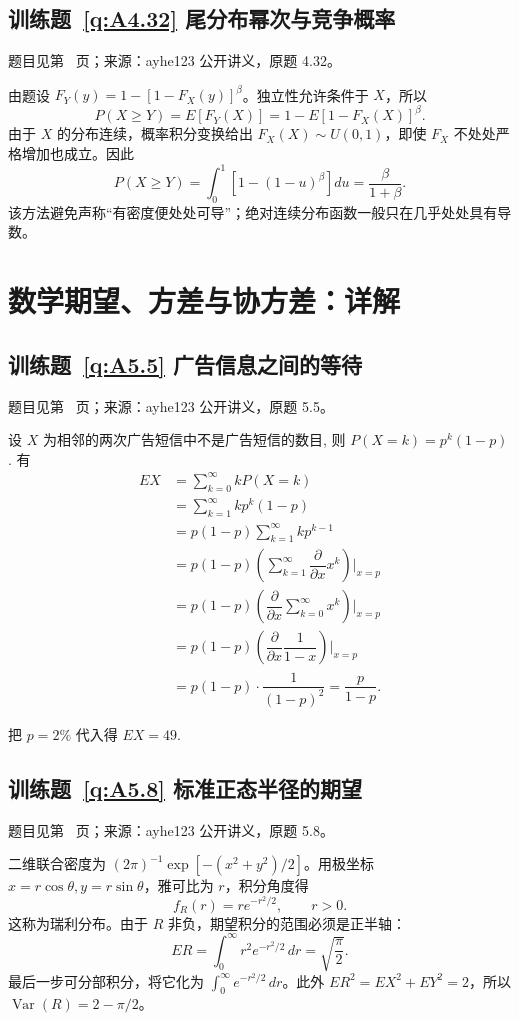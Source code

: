 \subsection*{训练题~\ref{q:A4.32} 尾分布幂次与竞争概率}\label{a:A4.32}{\small 题目见第~\pageref{q:A4.32} 页；来源：ayhe123 公开讲义，原题 4.32。}
\begin{solve}由题设 $F_Y(y)=1-[1-F_X(y)]^\beta$。独立性允许条件于 $X$，所以\[P(X\ge Y)=E[F_Y(X)]=1-E[1-F_X(X)]^\beta.\]由于 $X$ 的分布连续，概率积分变换给出 $F_X(X)\sim U(0,1)$，即使 $F_X$ 不处处严格增加也成立。因此\[P(X\ge Y)=\int_0^1[1-(1-u)^\beta]du=\frac{\beta}{1+\beta}.\]该方法避免声称“有密度便处处可导”；绝对连续分布函数一般只在几乎处处具有导数。\end{solve}

\clearpage\section*{数学期望、方差与协方差：详解}

\subsection*{训练题~\ref{q:A5.5} 广告信息之间的等待}\label{a:A5.5}{\small 题目见第~\pageref{q:A5.5} 页；来源：ayhe123 公开讲义，原题 5.5。}
\begin{solve}
    设 $X$ 为相邻的两次广告短信中不是广告短信的数目, 则 $P(X=k)=p^k(1-p)$. 有
    \begin{align*}
        EX & =\sum\limits_{k=0}^\infty kP(X=k) \\
        & =\sum\limits_{k=1}^\infty kp^k(1-p) \\
        & =p(1-p)\sum\limits_{k=1}^\infty kp^{k-1} \\
        & =p(1-p)\left(\sum\limits_{k=1}^\infty\dfrac{\partial}{\partial x}x^k\right)\Bigg|_{x=p} \\
        & =p(1-p)\left(\dfrac{\partial}{\partial x}\sum\limits_{k=0}^\infty x^k\right)\Bigg|_{x=p} \\
        & =p(1-p)\left(\dfrac{\partial}{\partial x}\dfrac{1}{1-x}\right)\Bigg|_{x=p} \\
        & =p(1-p)\cdot\dfrac{1}{(1-p)^2}=\dfrac{p}{1-p}.
    \end{align*}

    把 $p=2\%$ 代入得 $EX=49$.
\end{solve}

\subsection*{训练题~\ref{q:A5.8} 标准正态半径的期望}\label{a:A5.8}{\small 题目见第~\pageref{q:A5.8} 页；来源：ayhe123 公开讲义，原题 5.8。}
\begin{solve}二维联合密度为 $(2\pi)^{-1}\exp[-(x^2+y^2)/2]$。用极坐标 $x=r\cos\theta,y=r\sin\theta$，雅可比为 $r$，积分角度得\[f_R(r)=r e^{-r^2/2},\qquad r>0.\]这称为瑞利分布。由于 $R$ 非负，期望积分的范围必须是正半轴：\[ER=\int_0^\infty r^2e^{-r^2/2}\,dr=\sqrt{\frac\pi2}.\]最后一步可分部积分，将它化为 $\int_0^\infty e^{-r^2/2}\,dr$。此外 $ER^2=EX^2+EY^2=2$，所以 $\operatorname{Var}(R)=2-\pi/2$。\end{solve}


